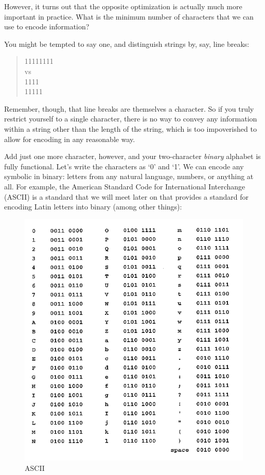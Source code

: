 \documentclass[UTF8]{book}
\begin{document}
\begin{CJK}{UTF8}{gbsn}
However, it turns out that the opposite optimization is actually much more important in practice. What is the minimum number of characters that we can use to encode information?

You might be tempted to say one, and distinguish strings by, say, line breaks:

\begin{quotation}
\centering

11111111 \\

vs \\

1111 \\
11111

\end{quotation}

Remember, though, that line breaks are themselves a character. So if you truly restrict yourself to a single character, there is no way to convey any information within a string other than the length of the string, which is too impoverished to allow for encoding in any reasonable way.

Add just one more character, however, and your two-character \emph{binary} alphabet is fully functional. Let's write the characters as `0' and `1'. We can encode any symbolic in binary: letters from any natural language, numbers, or anything at all. For example, the American Standard Code for International Interchange (ASCII) is a standard that we will meet later on that provides a standard for encoding Latin letters into binary (among other things):

\begin{figure}[H]
\centering
\includegraphics[width=0.8\linewidth]{ascii-binary-chart}
\caption{ASCII}
\end{figure}


\end{CJK}
\end{document}

